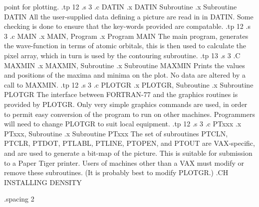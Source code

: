 point for plotting. 
.tp 12
.s 3
.c
DATIN
.x DATIN Subroutine
.x Subroutine DATIN
 All the user-supplied data defining a picture are read in in DATIN.
Some checking is done to ensure that the key-words provided are
compatable.
.tp 12
.s 3
.c
MAIN
.x MAIN, Program
.x Program MAIN
 The main program, generates the wave-function in terms of atomic
orbitals, this is then used to calculate the pixel array, which in
turn is used by the contouring subroutine.
.tp 13
.s 3
.C
 MAXMIN
.x MAXMIN, Subroutine
.x Subroutine MAXMIN
 Prints the values and positions of the maxima and minima on the plot.
No data are altered by a call to MAXMIN.
.tp 12
.s 3
.c
PLOTGR
.x PLOTGR, Subroutine
.x Subroutine PLOTGR
 The interface between FORTRAN-77 and the graphics routines is provided
by PLOTGR. Only very simple graphics commands are used, in order to
permit easy conversion of the program to run on other machines.
Programmers will need to change PLOTGR to suit local equipment.
.tp 12
.s 3
.c
PTxxx
.x PTxxx, Subroutine
.x Subroutine PTxxx
 The set of subroutines PTCLN, PTCLR, PTDOT, PTLABL, PTLINE, PTOPEN,
and PTOUT are VAX-specific, and are used to generate a bit-map of the
picture. This is suitable for submission to a Paper Tiger printer.
 Users of machines other than a VAX must modify or remove these
subroutines. (It is probably best to modify PLOTGR.)
.CH INSTALLING DENSITY

.spacing 2

